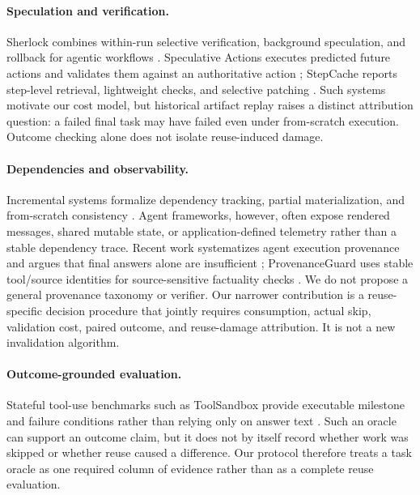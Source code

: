 \documentclass[letterpaper]{article} %
\begin{document}
\paragraph{Speculation and verification.}
Sherlock combines within-run selective verification, background speculation,
and rollback for agentic workflows \cite{sherlock2025}. Speculative Actions
executes predicted future actions and validates them against an authoritative
action \cite{speculativeActions2026}; StepCache reports step-level retrieval,
lightweight checks, and selective patching \cite{stepcache2026}. Such systems
motivate our cost model, but historical artifact replay raises a distinct
attribution question: a failed final task may have failed even under
from-scratch execution. Outcome checking alone does not isolate reuse-induced
damage.

\paragraph{Dependencies and observability.}
Incremental systems formalize dependency tracking, partial materialization,
and from-scratch consistency \cite{buildsystems2018,noria2018,dbsp2023}.
Agent frameworks, however, often expose rendered messages, shared mutable
state, or application-defined telemetry rather than a stable dependency trace.
Recent work systematizes agent execution provenance and argues that final
answers alone are insufficient \cite{agentTraceProvenance2026}; ProvenanceGuard
uses stable tool/source identities for source-sensitive factuality checks
\cite{provenanceGuard2026}. We do not propose a general provenance taxonomy or
verifier. Our narrower contribution is a reuse-specific decision procedure
that jointly requires consumption, actual skip, validation cost, paired
outcome, and reuse-damage attribution. It is not a new invalidation algorithm.

\paragraph{Outcome-grounded evaluation.}
Stateful tool-use benchmarks such as ToolSandbox provide executable milestone
and failure conditions rather than relying only on answer text
\cite{toolsandbox2025}. Such an oracle can support an outcome claim, but it
does not by itself record whether work was skipped or whether reuse caused a
difference. Our protocol therefore treats a task oracle as one required column
of evidence rather than as a complete reuse evaluation.
\end{document}
